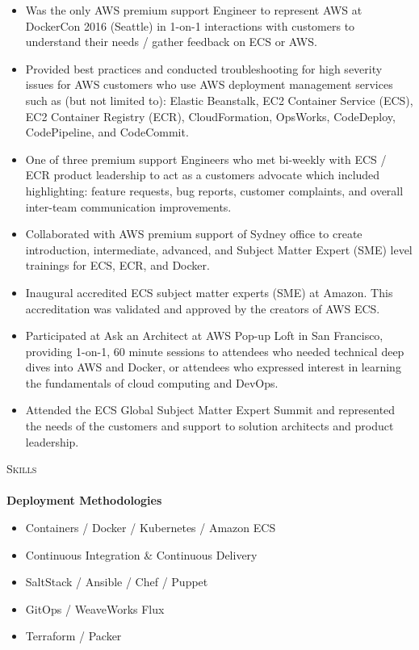 \documentclass[a4paper]{article}
\newcommand{\lineunder} {
    \vspace*{-8pt} \\
    \hspace*{-18pt} \hrulefill \\
}
\newcommand{\header} [1] {
    {\hspace*{-18pt}\vspace*{6pt} \textsc{#1}}
    \vspace*{-6pt} \lineunder
}
\begin{document}
\begin{itemize} \itemsep 1pt
    \item Was the only AWS premium support Engineer to represent AWS at DockerCon 2016 (Seattle) in 1-on-1 interactions with customers to understand their needs / gather feedback on ECS or AWS.
    \item Provided best practices and conducted troubleshooting for high severity issues for AWS customers who use AWS deployment management services such as (but not limited to): Elastic Beanstalk, EC2 Container Service (ECS), EC2 Container Registry (ECR), CloudFormation, OpsWorks, CodeDeploy, CodePipeline, and CodeCommit.
    \item One of three premium support Engineers who met bi-weekly with ECS / ECR product leadership to act as a customer\textsc{}s advocate which included highlighting: feature requests, bug reports, customer complaints, and overall inter-team communication improvements.
    \item Collaborated with AWS premium support of Sydney office to create introduction, intermediate, advanced, and Subject Matter Expert (SME) level trainings for ECS, ECR, and Docker.
    \item Inaugural accredited ECS subject matter experts (SME) at Amazon. This accreditation was validated and approved by the creators of AWS ECS. 
    \item Participated at \textquotedbl{}Ask an Architect\textquotedbl{} at AWS Pop-up Loft in San Francisco, providing 1-on-1, 60 minute sessions to attendees who needed technical deep dives into AWS and Docker, or attendees who expressed interest in learning the fundamentals of cloud computing and DevOps.
    \item Attended the ECS Global Subject Matter Expert Summit and represented the needs of the customers and support to solution architects and product leadership.
\end{itemize}

\header{Skills}
\textbf{Deployment Methodologies}\\
\vspace{-1mm}
\begin{itemize} \itemsep 1pt
    \item Containers / Docker / Kubernetes / Amazon ECS
    \item Continuous Integration \& Continuous Delivery
    \item SaltStack / Ansible / Chef / Puppet
    \item GitOps / WeaveWorks Flux
    \item Terraform / Packer
\end{itemize}
\end{document}
